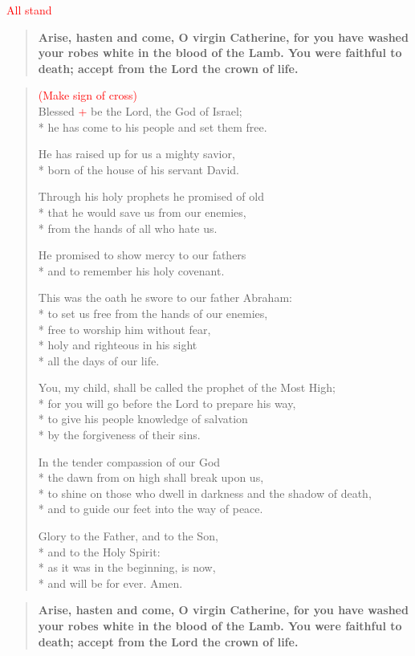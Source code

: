 \documentclass[letterpaper,14pt]{extarticle}
\newcommand{\side}[1]{\flagverse{\textcolor{red}{\textit{#1}}:}}
\newcommand{\rednote}[1]{\textcolor{red}{#1}}
\newlength{\oldindent}
\newcommand{\antiphon}[2]{
	\setlength{\oldindent}{\vindent}
	\setlength{\vindent}{0em}
	\begin{verse}
	\side{#1} \textbf{#2}
	\end{verse}
	\setlength{\vindent}{\oldindent}
}
\begin{document}
\rednote{All stand}
\antiphon{Leader}{Arise, hasten and come, O virgin Catherine, for you have washed your robes white in the blood of the Lamb.  You were faithful to death; accept from the Lord the crown of life.}
\begin{verse}
\rednote{(Make sign of cross)}\\
\side{All} Blessed \rednote{+} be the Lord, the God of Israel; \\*
he has come to his people and set them free.

He has raised up for us a mighty savior, \\*
born of the house of his servant David.

Through his holy prophets he promised of old \\*
  that he would save us from our enemies, \\*
  from the hands of all who hate us.

He promised to show mercy to our fathers \\*
and to remember his holy covenant.

This was the oath he swore to our father Abraham: \\*
to set us free from the hands of our enemies, \\*
free to worship him without fear, \\*
holy and righteous in his sight \\*
   all the days of our life.

You, my child, shall be called the prophet of the Most High; \\*
for you will go before the Lord to prepare his way, \\*
to give his people knowledge of salvation \\*
by the forgiveness of their sins.

In the tender compassion of our God \\*
the dawn from on high shall break upon us, \\*
to shine on those who dwell in darkness and the shadow of death, \\*
and to guide our feet into the way of peace.

Glory to the Father, and to the Son, \\*
and to the Holy Spirit: \\*
as it was in the beginning, is now, \\*
and will be for ever. Amen.
\end{verse}
\antiphon{All}{Arise, hasten and come, O virgin Catherine, for you have washed your robes white in the blood of the Lamb.  You were faithful to death; accept from the Lord the crown of life.}
\end{document}
